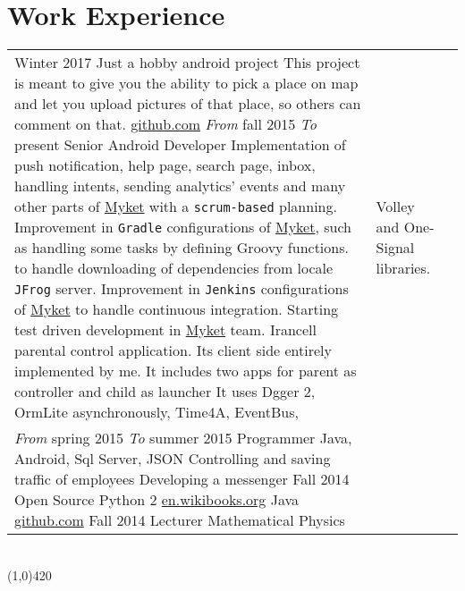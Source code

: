 \documentclass[10pt]{article}
\newcommand\HRule{\hspace*{.8cm}\line(1,0){420}\\}
\newenvironment{Record}[1]
{
    \vspace{-0.35cm}
    \section*{#1}
        \vspace{0.1cm}
        \begin{tabular}
}
{
        \end{tabular}\\
        \HRule
}
\begin{document}
\newcommand{\WorkExperienceHasinTwo}[1]{
                &       \quad\quad #1\\
}


\begin{Record}{Work Experience}{l l l}
    \WorkExperience{Hobby Taste}
        {Winter 2017}{}
        {Just a hobby android project}
        {This project is meant to give you the ability to pick a place on map}
        {and let you upload pictures of that place, so others can comment on that.}
        {\href{https://github.com/hadilq/HobbyTaste}{github.com}}
        {}{}%
    \WorkExperience{\href{http://hasintech.com}{Hasin Technology}}
        {\textit{From} fall 2015}
        {\textit{To} present}
        {Senior Android Developer}
        {Implementation of push notification, help page, }
        {search page, inbox, handling intents, sending analytics' events}
        {and many other parts of \href{http://myket.ir}{Myket} with a  \texttt{scrum-based} planning.}
        {Improvement in \texttt{Gradle} configurations of \href{http://myket.ir}{Myket},}
        {such as handling some tasks by defining Groovy functions.}%
    \WorkExperienceHasinOne{Improvement in \texttt{Maven} configurations of \href{http://myket.ir}{Myket}}
        {to handle downloading of dependencies from locale \texttt{JFrog} server.}
        {Improvement in \texttt{Jenkins} configurations of \href{http://myket.ir}{Myket}}
        {to handle continuous integration.}
        {Starting test driven development in \href{http://myket.ir}{Myket} team.}
        {Irancell parental control application.}
        {Its client side entirely implemented by me.}
        {It includes two apps for parent as controller and child as launcher}
        {It uses Dgger 2, OrmLite asynchronously, Time4A, EventBus,}%
    \WorkExperienceHasinTwo{Volley and One-Signal libraries.}%
    \WorkExperience{\href{http://sohasys.ir}{Soha Company}}
        {\textit{From} spring 2015}
        {\textit{To} summer 2015}
        {Programmer}
        {Java, Android, Sql Server, JSON}
        {Controlling and saving traffic of employees}
        {Developing a messenger}
        {}{}%
    \WorkExperience{Persian Calendar}
        {Fall 2014}{}
        {Open Source}
        {Python 2}
        {\href{http://en.wikibooks.org/wiki/Persian_Calendar}{en.wikibooks.org}}
        {Java}
        {\href{https://github.com/hadilq/java-persian-calendar}{github.com}}{}%
    \WorkExperience{\href{http://en.pnu.ac.ir/Portal/Home}{Payame-Noor University}}
        {Fall 2014}{}
        {Lecturer}
        {Mathematical Physics}
        {}{}{}{}%

\end{Record}
\end{document}
